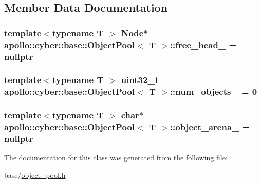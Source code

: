 \subsection{Member Data Documentation}
\hypertarget{classapollo_1_1cyber_1_1base_1_1ObjectPool_a2b393acf60e1b2ec7a75006af09dda23}{
\subsubsection[{free\-\_\-head\-\_\-}]{\setlength{\rightskip}{0pt plus 5cm}template$<$typename T $>$ {\bf Node}$\ast$ {\bf apollo\-::cyber\-::base\-::\-Object\-Pool}$<$ T $>$\-::free\-\_\-head\-\_\- = nullptr\hspace{0.3cm}{\ttfamily [private]}}}\label{classapollo_1_1cyber_1_1base_1_1ObjectPool_a2b393acf60e1b2ec7a75006af09dda23}
\hypertarget{classapollo_1_1cyber_1_1base_1_1ObjectPool_a83d8b9c2acc9e54022d86a6758087ad4}{
\subsubsection[{num\-\_\-objects\-\_\-}]{\setlength{\rightskip}{0pt plus 5cm}template$<$typename T $>$ uint32\-\_\-t {\bf apollo\-::cyber\-::base\-::\-Object\-Pool}$<$ T $>$\-::num\-\_\-objects\-\_\- = 0\hspace{0.3cm}{\ttfamily [private]}}}\label{classapollo_1_1cyber_1_1base_1_1ObjectPool_a83d8b9c2acc9e54022d86a6758087ad4}
\hypertarget{classapollo_1_1cyber_1_1base_1_1ObjectPool_a611e7b13c400c42846d870fcc668ddfb}{
\subsubsection[{object\-\_\-arena\-\_\-}]{\setlength{\rightskip}{0pt plus 5cm}template$<$typename T $>$ char$\ast$ {\bf apollo\-::cyber\-::base\-::\-Object\-Pool}$<$ T $>$\-::object\-\_\-arena\-\_\- = nullptr\hspace{0.3cm}{\ttfamily [private]}}}\label{classapollo_1_1cyber_1_1base_1_1ObjectPool_a611e7b13c400c42846d870fcc668ddfb}


The documentation for this class was generated from the following file\-:\begin{DoxyCompactItemize}
\item 
base/\hyperlink{object__pool_8h}{object\-\_\-pool.\-h}\end{DoxyCompactItemize}
